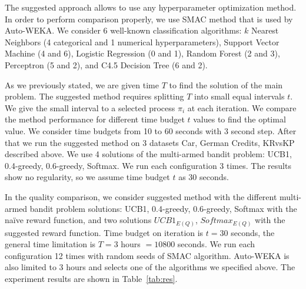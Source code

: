 \documentclass{svproc}
\begin{document}
The suggested approach allows to use any hyperparameter optimization method. In order to perform comparison properly, we use SMAC method that is used by Auto-WEKA. We consider 6 well-known classification algorithms: $k$ Nearest Neighbors (4 categorical and 1 numerical hyperparameters), Support Vector Machine (4 and 6), Logistic Regression (0 and 1), Random Forest (2 and 3), Perceptron (5 and 2), and C4.5 Decision Tree (6 and 2). %


As we previously stated, we are given time $T$ to find the solution of the main problem. The suggested method requires splitting $T$ into small equal intervals $t$. We give the small interval to a selected process $\pi_i$ at each iteration.
%
We compare the method performance for different time budget $t$ values to find the optimal value. We consider time budgets from 10 to 60 seconds with 3 second step. After that we run the suggested method on 3 datasets Car, German Credits, KRvsKP described above. We use 4 solutions of the multi-armed bandit problem: UCB1, 0.4-greedy, 0.6-greedy, Softmax. We run each configuration 3 times. The results show no regularity, so we assume time budget $t$ as 30 seconds. 

In the quality comparison, we consider suggested method with the different multi-armed bandit problem solutions: UCB1, 0.4-greedy, 0.6-greedy, Softmax with the na\"ive reward function, and two solutions $UCB1_{E(Q)}$, $Softmax_{E(Q)}$ with the suggested reward function. Time budget on iteration is $t = 30$ seconds, the general time limitation is $T = 3$ hours $= 10800$ seconds. We run each configuration 12 times with random seeds of SMAC algorithm. Auto-WEKA is also limited to 3 hours and selects one of the algorithms we specified above. The experiment results are shown in Table~\ref{tab:res}. 
\end{document}
